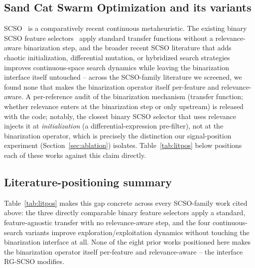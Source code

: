 \documentclass[iicol,sn-basic,pdflatex]{sn-jnl}
\begin{document}
\subsection{Sand Cat Swarm Optimization and its variants}
SCSO~\cite{scso} is a comparatively recent continuous metaheuristic. The
existing binary SCSO feature selectors~\cite{bscso,scsofs2,scsofs3} apply
standard transfer functions without a relevance-aware binarization step, and
the broader recent SCSO literature that adds chaotic initialization,
differential mutation, or hybridized search
strategies~\cite{imscso2024,mescso2025,scsolensobl2024,improvedscso2024}
improves continuous-space search dynamics while leaving the binarization
interface itself untouched -- across the SCSO-family literature we screened,
we found none that makes
the binarization operator itself per-feature and relevance-aware. A
per-reference audit of the binarization mechanism (transfer function;
whether relevance enters at the binarization step or only upstream) is
released with the code; notably, the closest binary SCSO selector that uses
relevance injects it at \emph{initialization} (a differential-expression
pre-filter), not at the binarization operator, which is precisely the
distinction our signal-position experiment (Section~\ref{sec:ablation})
isolates. Table~\ref{tab:litpos} below positions each of these works against
this claim directly.

\subsection{Literature-positioning summary}
Table~\ref{tab:litpos} makes this gap concrete across every SCSO-family
work cited above: the three directly comparable binary feature selectors
apply a standard, feature-agnostic transfer with no relevance-aware step,
and the four continuous-search variants improve exploration/exploitation
dynamics without touching the binarization interface at all. None of the
eight prior works positioned here makes the binarization operator itself
per-feature and relevance-aware -- the interface RG-SCSO modifies.
\end{document}
